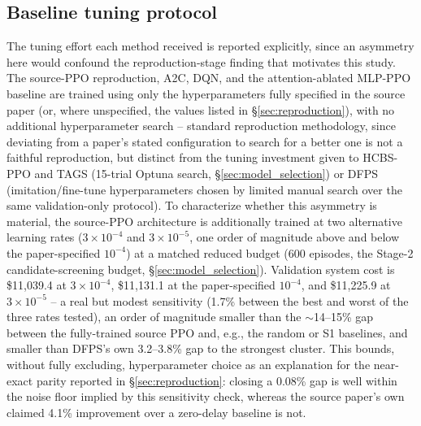 \documentclass[journal]{IEEEtran}
\begin{document}
\subsection{Baseline tuning protocol}
The tuning effort each method received is reported explicitly, since an asymmetry here would confound the reproduction-stage finding that motivates this study. The source-PPO reproduction, A2C, DQN, and the attention-ablated MLP-PPO baseline are trained using only the hyperparameters fully specified in the source paper \cite{sourcepaper} (or, where unspecified, the values listed in \S\ref{sec:reproduction}), with no additional hyperparameter search -- standard reproduction methodology, since deviating from a paper's stated configuration to search for a better one is not a faithful reproduction, but distinct from the tuning investment given to HCBS-PPO and TAGS (15-trial Optuna search, \S\ref{sec:model_selection}) or DFPS (imitation/fine-tune hyperparameters chosen by limited manual search over the same validation-only protocol). To characterize whether this asymmetry is material, the source-PPO architecture is additionally trained at two alternative learning rates ($3{\times}10^{-4}$ and $3{\times}10^{-5}$, one order of magnitude above and below the paper-specified $10^{-4}$) at a matched reduced budget (600 episodes, the Stage-2 candidate-screening budget, \S\ref{sec:model_selection}). Validation system cost is \$11{,}039.4 at $3{\times}10^{-4}$, \$11{,}131.1 at the paper-specified $10^{-4}$, and \$11{,}225.9 at $3{\times}10^{-5}$ -- a real but modest sensitivity (1.7\% between the best and worst of the three rates tested), an order of magnitude smaller than the $\sim$14--15\% gap between the fully-trained source PPO and, e.g., the random or S1 baselines, and smaller than DFPS's own 3.2--3.8\% gap to the strongest cluster. This bounds, without fully excluding, hyperparameter choice as an explanation for the near-exact parity reported in \S\ref{sec:reproduction}: closing a 0.08\% gap is well within the noise floor implied by this sensitivity check, whereas the source paper's own claimed 4.1\% improvement over a zero-delay baseline is not.
\end{document}
